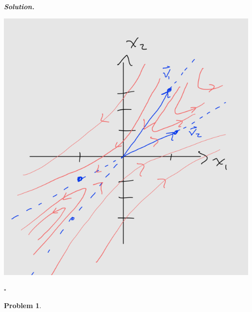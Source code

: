 \documentclass[12pt]{report}
\newtheorem{problem}{Problem}
\newenvironment{solution}[1][\it{Solution}]{\textbf{#1. } }{$\square$}
\begin{document}
\begin{solution}
\begin{enumerate}
        \begin{center}
            \includegraphics[width=.6\linewidth]{images/5.PNG}
        \end{center}
    \end{enumerate}
\end{solution}
\newpage



\begin{problem}
    
\end{problem}
\end{document}

